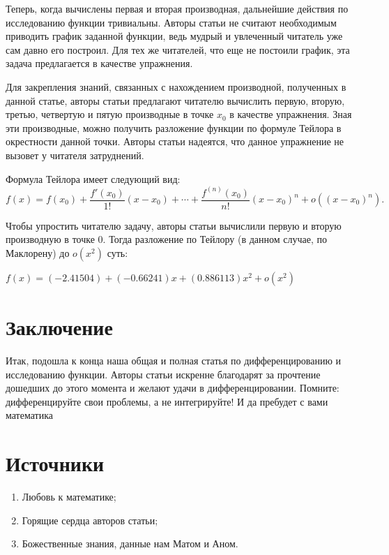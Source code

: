 \documentclass{article}
\begin{document}
Теперь, когда вычислены первая и вторая производная, дальнейшие действия по исследованию функции тривиальны. Авторы статьи не считают необходимым приводить график заданной функции, ведь мудрый и увлеченный читатель уже сам давно его построил. Для тех же читателей, что еще не постоили график, эта задача предлагается в качестве упражнения.

Для закрепления знаний, связанных с нахождением производной, полученных в данной статье, авторы статьи предлагают читателю вычислить первую, вторую, третью, четвертую и пятую производные в точке $x_0$ в качестве упражнения. Зная эти производные, можно получить разложение функции по формуле Тейлора в окрестности данной точки. Авторы статьи надеятся, что данное упражнение не вызовет у читателя затруднений.

Формула Тейлора имеет следующий вид:
$$f(x) = f(x_0) + \frac{f'(x_0)}{1!}(x - x_0) + \cdots + \frac{f^{(n)}(x_0)}{n!}(x - x_0)^n + o((x - x_0)^n).$$

Чтобы упростить читателю задачу, авторы статьи вычислили первую и вторую производную в точке 0. Тогда разложение по Тейлору (в данном случае, по Маклорену) до $o(x^2)$ суть:

 $f(x) = (-2.41504) + (-0.66241)x + (0.886113)x^2 + o(x^2)$ 

\section{Заключение}

Итак, подошла к конца наша общая и полная статья по дифференцированию и исследованию функции. Авторы статьи искренне благодарят за прочтение дошедших до этого момента и желают удачи в дифференцировании. Помните: дифференцируйте свои проблемы, а не интегрируйте! И да пребудет с вами математика

\section*{Источники}
\begin{enumerate}
	\item Любовь к математике;
	\item Горящие сердца авторов статьи;
	\item Божественные знания, данные нам Матом и Аном.
\end{enumerate}
\end{document}
